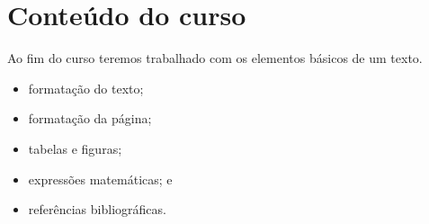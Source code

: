 \documentclass[a5paper,11pt,article,oneside]{memoir}
\begin{document}
\chapter{Conteúdo do curso}

Ao fim do curso teremos trabalhado com os
elementos básicos de um texto.

\begin{itemize}
\item formatação do texto;
\item formatação da página;
\item tabelas e figuras;
\item expressões matemáticas; e
\item referências bibliográficas.
\end{itemize}


\end{document}
